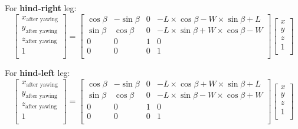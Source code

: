 For \textbf{hind-right} leg:
\begin{equation}
   \begin{bmatrix}
   x_\text{after yawing} \\
   y_\text{after yawing} \\
   z_\text{after yawing} \\
   1                     \\
   \end{bmatrix}
   =
   \begin{bmatrix}
   \cos\beta & -\sin\beta & 0 & -L \times \cos\beta - W \times \sin\beta + L \\
   \sin\beta & \cos\beta & 0 & -L \times \sin\beta + W \times \cos\beta - W \\
   0 & 0 & 1 & 0 \\
   0 & 0 & 0 & 1 \\
   \end{bmatrix}
   \begin{bmatrix}
   x \\
   y \\
   z \\
   1 \\
   \end{bmatrix}
\end{equation}

For \textbf{hind-left} leg:
\begin{equation}
   \begin{bmatrix}
   x_\text{after yawing} \\
   y_\text{after yawing} \\
   z_\text{after yawing} \\
   1                     \\
   \end{bmatrix}
   =
   \begin{bmatrix}
   \cos\beta & -\sin\beta & 0 & -L \times \cos\beta + W \times \sin\beta + L \\
   \sin\beta & \cos\beta & 0 & -L \times \sin\beta - W \times \cos\beta + W \\
   0 & 0 & 1 & 0 \\
   0 & 0 & 0 & 1 \\
   \end{bmatrix}
   \begin{bmatrix}
   x \\
   y \\
   z \\
   1 \\
   \end{bmatrix}
\end{equation}

